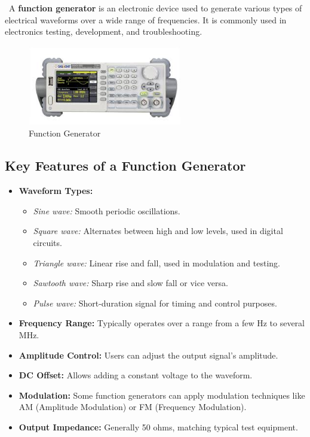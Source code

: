 \
A \textbf{function generator} is an electronic device used to generate various types of electrical waveforms over a wide range of frequencies. It is commonly used in electronics testing, development, and troubleshooting.

\begin{figure}[h!]
    \centering
    \includegraphics[width=0.6\textwidth]{figures/functiongenerator.jpeg}
    \caption{Function Generator}
    \label{fig:sample_image}
\end{figure}
\subsection{Key Features of a Function Generator}
\begin{itemize}
    \item \textbf{Waveform Types:}
    \begin{itemize}
        \item \textit{Sine wave:} Smooth periodic oscillations.
        \item \textit{Square wave:} Alternates between high and low levels, used in digital circuits.
        \item \textit{Triangle wave:} Linear rise and fall, used in modulation and testing.
        \item \textit{Sawtooth wave:} Sharp rise and slow fall or vice versa.
        \item \textit{Pulse wave:} Short-duration signal for timing and control purposes.\\
    \end{itemize}
    \item \textbf{Frequency Range:} Typically operates over a range from a few Hz to several MHz.
    \item \textbf{Amplitude Control:} Users can adjust the output signal's amplitude.
    \item \textbf{DC Offset:} Allows adding a constant voltage to the waveform.
    \item \textbf{Modulation:} Some function generators can apply modulation techniques like AM (Amplitude Modulation) or FM (Frequency Modulation).
    \item \textbf{Output Impedance:} Generally 50 ohms, matching typical test equipment.
\end{itemize}
